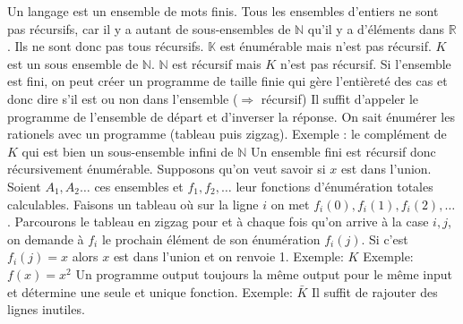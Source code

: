 \begin{mcqs}
  {Un langage est un ensemble de mots finis. Tous les ensembles d'entiers ne sont pas récursifs, car il y a autant de sous-ensembles de $\mathbb{N}$ qu'il y a d'éléments dans $\mathbb{R}$. Ils ne sont donc pas tous récursifs.}
  {$\mathbb{K}$ est énumérable mais n'est pas récursif.}
  {$K$ est un sous ensemble de $\mathbb{N}$. $\mathbb{N}$ est récursif mais $K$ n'est pas récursif.}
  {Si l'ensemble est fini, on peut créer un programme de taille finie qui gère l'entièreté des cas et donc dire s'il est ou non dans l'ensemble ($\Rightarrow$ récursif)}
  {Il suffit d'appeler le programme de l'ensemble de départ et d'inverser la réponse.}
  {On sait énumérer les rationels avec un programme (tableau puis zigzag).}
  {Exemple : le complément de $K$ qui est bien un sous-ensemble infini de $\mathbb{N}$}
  {Un ensemble fini est récursif donc récursivement énumérable.}
  {Supposons qu'on veut savoir si $x$ est dans l'union.
   Soient $A_1, A_2 \ldots$ ces ensembles et $f_1, f_2, \ldots$ leur fonctions d'énumération totales calculables.
   Faisons un tableau où sur la ligne $i$ on met $f_i(0), f_i(1), f_i(2), \ldots$.
   Parcourons le tableau en zigzag pour et à chaque fois qu'on arrive à la case $i,j$, on demande à $f_i$ le prochain élément
   de son énumération $f_i(j)$.
   Si c'est $f_i(j) = x$ alors $x$ est dans l'union et on renvoie 1.}
  {Exemple: $K$}
  {Exemple: $f(x) = x^2$}
  {Un programme output toujours la même output pour le même input et détermine une seule et unique fonction.}
  {Exemple: $\bar{K}$}
  {Il suffit de rajouter des lignes inutiles.}

\end{mcqs}
